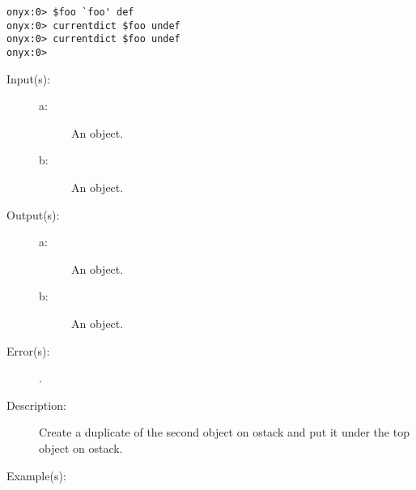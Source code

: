 \begin{description}
\begin{description}
\begin{verbatim}
onyx:0> $foo `foo' def
onyx:0> currentdict $foo undef
onyx:0> currentdict $foo undef
onyx:0>
		\end{verbatim}
	\end{description}
\label{systemdict:under}
\item[{\onyxop{a b}{under}{a a b}}: ]
	\begin{description}\item[]
	\item[Input(s): ]
		\begin{description}\item[]
		\item[a: ]
			An object.
		\item[b: ]
			An object.
		\end{description}
	\item[Output(s): ]
		\begin{description}\item[]
		\item[a: ]
			An object.
		\item[b: ]
			An object.
		\end{description}
	\item[Error(s): ]
		\begin{description}\item[]
		\item[.]
		\end{description}
	\item[Description: ]
		Create a duplicate of the second object on ostack and put it
		under the top object on ostack.
	\item[Example(s): ]\begin{verbatim}


\end{verbatim}
\end{description}
\end{description}
